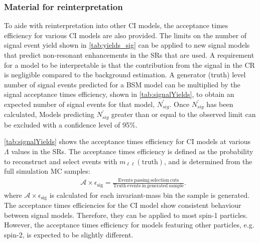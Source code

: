 \subsubsection{Material for reinterpretation}\label{sec:results:reinterp}
To aide with reinterpretation into other CI models, the acceptance times efficiency for various CI models are also provided. The limits on the number of signal event yield shown in \cref{tab:yields_sig} can be applied to new signal models that predict non-resonant enhancements in the SRs that are used. A requirement for a model to be interpretable is that the contribution from the signal in the CR is negligible compared to the background estimation. A generator (truth) level number of signal events predicted for a BSM model can be multiplied by the signal acceptance times efficiency, shown in \cref{tab:signalYields}, to obtain an expected number of signal events for that model, $N_{sig}^\prime$. Once $N_{sig}^\prime$ has been calculated, Models predicting $N_{sig}^\prime$ greater than or equal to the observed limit can be excluded with a confidence level of 95\%.

\cref{tab:signalYields} shows the acceptance times efficiency for CI models at various $\Lambda$ values in the SRs. The acceptance times efficiency is defined as the probability to reconstruct and select events with $m_{\ell\ell}(\mathrm{truth})$, and is determined from the full simulation MC samples:
\begin{equation}
    \label{eq:atimee}
    \begin{aligned}
        & \mathcal{A}\times\epsilon_\textrm{sig} = \frac{\mathrm{Events~passing~selection~cuts}}{\mathrm{Truth~events~in~generated~sample}}.
    \end{aligned}
\end{equation}
where $\mathcal{A}\times\epsilon_\textrm{sig}$ is calculated for each invariant-mass bin the sample is generated. The acceptance times efficiencies for the CI model show consistent behaviour between signal models. Therefore, they can be applied to most spin-1 particles. However, the acceptance times efficiency for models featuring other particles, e.g. spin-2, is expected to be slightly different. 

